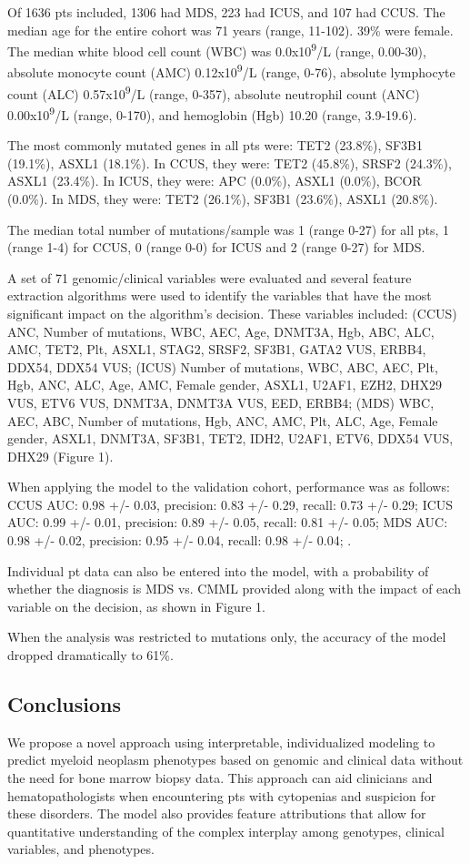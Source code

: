 Of 1636 pts included, 1306 had MDS, 223 had ICUS, and 107 had CCUS. The median age for the entire cohort was 71 years (range, 11-102). 39\% were female. The median white blood cell count (WBC) was 0.0x10\textsuperscript{9}/L (range, 0.00-30), absolute monocyte count (AMC) 0.12x10\textsuperscript{9}/L (range, 0-76), absolute lymphocyte count (ALC) 0.57x10\textsuperscript{9}/L (range, 0-357), absolute neutrophil count (ANC) 0.00x10\textsuperscript{9}/L (range, 0-170), and hemoglobin (Hgb) 10.20 (range, 3.9-19.6). 

The most commonly mutated genes in all pts were: TET2 (23.8\%), SF3B1 (19.1\%), ASXL1 (18.1\%). In CCUS, they were: TET2 (45.8\%), SRSF2 (24.3\%), ASXL1 (23.4\%). In ICUS, they were: APC (0.0\%), ASXL1 (0.0\%), BCOR (0.0\%). In MDS, they were: TET2 (26.1\%), SF3B1 (23.6\%), ASXL1 (20.8\%).

The median total number of mutations/sample was 1 (range 0-27) for all pts, 1 (range 1-4) for CCUS, 0 (range 0-0) for ICUS and 2 (range 0-27) for MDS.


A set of 71 genomic/clinical variables were evaluated and several feature extraction algorithms were used to identify the variables that have the most significant impact on the algorithm's decision. These variables included: (CCUS) ANC, Number of mutations, WBC, AEC, Age, DNMT3A, Hgb, ABC, ALC, AMC, TET2, Plt, ASXL1, STAG2, SRSF2, SF3B1, GATA2 VUS, ERBB4, DDX54, DDX54 VUS; (ICUS) Number of mutations, WBC, ABC, AEC, Plt, Hgb, ANC, ALC, Age, AMC, Female gender, ASXL1, U2AF1, EZH2, DHX29 VUS, ETV6 VUS, DNMT3A, DNMT3A VUS, EED, ERBB4; (MDS) WBC, AEC, ABC, Number of mutations, Hgb, ANC, AMC, Plt, ALC, Age, Female gender, ASXL1, DNMT3A, SF3B1, TET2, IDH2, U2AF1, ETV6, DDX54 VUS, DHX29 (Figure 1).

When applying the model to the validation cohort, performance was as follows: CCUS AUC: 0.98 +/- 0.03, precision: 0.83 +/- 0.29, recall: 0.73 +/- 0.29; ICUS AUC: 0.99 +/- 0.01, precision: 0.89 +/- 0.05, recall: 0.81 +/- 0.05; MDS AUC: 0.98 +/- 0.02, precision: 0.95 +/- 0.04, recall: 0.98 +/- 0.04; .

Individual pt data can also be entered into the model, with a probability of whether the diagnosis is MDS vs. CMML provided along with the impact of each variable on the decision, as shown in Figure 1.

When the analysis was restricted to mutations only, the accuracy of the model dropped dramatically to 61\%.


\subsection{Conclusions}%

We propose a novel approach using interpretable, individualized modeling to predict myeloid neoplasm phenotypes based on genomic and clinical data without the need for bone marrow biopsy data. This approach can aid clinicians and hematopathologists when encountering pts with cytopenias and suspicion for these disorders. The model also provides feature attributions that allow for quantitative understanding of the complex interplay among genotypes, clinical variables, and phenotypes.



